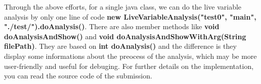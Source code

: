 \documentclass[conference]{IEEEtran}
\begin{document}
Through the above efforts, for a single java class, we can do the live variable analysis by only one line of code \textbf{new LiveVariableAnalysis("test0", "main", "./test/").doAnalysis()}. 
There are also member methods like \textbf{void doAnalysisAndShow()} and \textbf{void doAnalysisAndShowWithArg(String filePath)}. 
They are based on \textbf{int doAnalysis()} and the difference is they display some informations about the preocess of the analysis, which may be more user-friendly and useful for debuging.
For further details on the implementation, you can read the source code of the submission.
\end{document}
